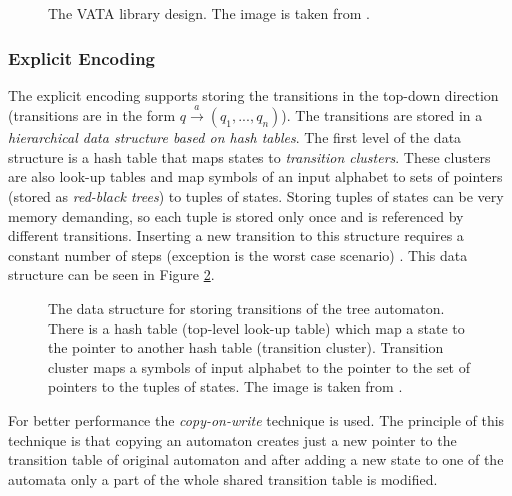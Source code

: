 \begin{figure}
\begin{center}

		\caption{The VATA library design. The image is taken from \cite{libvata}.}
		\label{picVataDesign}
\end{center}
\end{figure}

\subsubsection{Explicit Encoding}
\label{sectionExplicitEnc}
The explicit encoding supports storing the transitions in the top-down direction (transitions are in the form $q \xrightarrow{a} (q_1,...,q_n)$). The transitions
are stored in a \emph{hierarchical data structure based on hash tables}. The first level of the data structure is a hash table
that maps states to \emph{transition clusters}. These clusters are also look-up tables and map symbols of an input alphabet
to sets of pointers (stored as \emph{red-black trees}) to tuples of states. Storing tuples of states can be very memory demanding, so each tuple is stored
only once and is referenced by different transitions. 
Inserting a new transition to this structure requires a constant number of steps (exception is the worst case scenario) %
\cite{libvata}. This data structure can be seen in Figure \ref{figExplicitTreeDataStr}.

\begin{figure}
\begin{center}

    \caption{The data structure for storing transitions of the tree automaton. There is a hash table (top-level look-up table) 
      which map a state to the pointer to another hash table (transition cluster). Transition cluster
      maps a symbols of input alphabet to the pointer to the set of pointers to the tuples of states. The image is taken from \cite{libvata}.}
		\label{figExplicitTreeDataStr}
\end{center}
\end{figure}


For better performance the \emph{copy-on-write} technique \cite{libvata} is used. The principle of this technique is 
that copying an automaton creates just a new pointer to the transition table of original automaton and after adding a new state to one of the automata 
only a part of the whole shared transition table is modified. 


